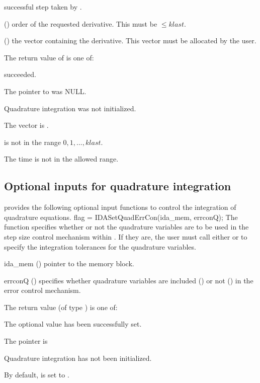 {{\begin{args}
    successful step taken by {\idas}.
  \item[\id{k}] () order of the requested derivative.  This
    must be $\leq klast$. 
  \item[\id{dkyQ}] ()
    the vector containing the derivative. This vector must be allocated by the user. 
  \end{args}
}
{
  The return value  of  is one of:
  \begin{args}
  \item[\Id{IDA\_SUCCESS}]
     succeeded.
  \item[\Id{IDA\_MEM\_NULL}]
    The pointer to  was NULL.
  \item[\Id{IDA\_NO\_QUAD}] 
    Quadrature integration was not initialized.
  \item[\Id{IDA\_BAD\_DKY}] 
    The vector  is .
  \item[\Id{IDA\_BAD\_K}]
     is not in the range $0, 1, ..., klast$.
  \item[\Id{IDA\_BAD\_T}] 
    The time  is not in the allowed range.
  \end{args}
}
{}


\subsection{Optional inputs for quadrature integration}\label{ss:quad_optional_input}
{\idas} provides the following optional input functions to control the integration
of quadrature equations.
{
 flag = IDASetQuadErrCon(ida\_mem, errconQ);
}
{
  The function  specifies whether or not the
  quadrature variables are to be used in the step size control mechanism
  within {\idas}.  If they are, the user must call either 
  or  to specify the 
  integration tolerances for the quadrature variables.  
}
{
  \begin{args}
  \item[ida\_mem] ()
    pointer to the {\idas} memory block.
  \item[errconQ] ()
    specifies whether quadrature variables are included () or not
    () in the error control mechanism. 
  \end{args}
}
{
  The return value  (of type ) is one of:
  \begin{args}
  \item[\Id{IDA\_SUCCESS}] 
    The optional value has been successfully set.
  \item[\Id{IDA\_MEM\_NULL}]
    The  pointer is 
  \item[\Id{IDA\_NO\_QUAD}]
    Quadrature integration has not been initialized.
  \end{args}
}
{
  By default,  is set to . 

}}

